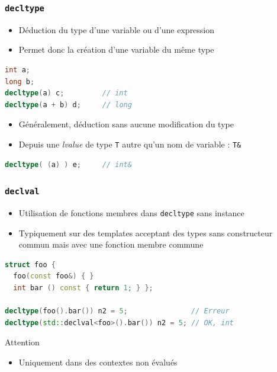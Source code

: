 \documentclass[C++.tex]{subfiles}
\begin{document}
\begin{frame}[fragile]
	\frametitle{\lstinline|decltype|}
	\begin{itemize}
		\item Déduction du type d'une variable ou d'une expression
		\item Permet donc la création d'une variable du même type
	\end{itemize}

	\begin{lstlisting}[language=C++]
int a;
long b;
decltype(a) c;         // int
decltype(a + b) d;     // long\end{lstlisting}

	\begin{itemize}
		\item Généralement, déduction sans aucune modification du type


		\item Depuis une \textit{lvalue} de type \lstinline|T| autre qu'un nom de variable : \lstinline|T&|
	\end{itemize}

	\begin{lstlisting}[language=C++]
decltype( (a) ) e;     // int&\end{lstlisting}

\end{frame}

\begin{frame}[fragile]
	\frametitle{\lstinline|declval|}
	\begin{itemize}
		\item Utilisation de fonctions membres dans \lstinline|decltype| sans instance
		\item Typiquement sur des templates acceptant des types sans constructeur commun mais avec une fonction membre commune
	\end{itemize}
	
	\begin{lstlisting}[language=C++]
struct foo {
  foo(const foo&) { }
  int bar () const { return 1; } };

decltype(foo().bar()) n2 = 5;               // Erreur
decltype(std::declval<foo>().bar()) n2 = 5; // OK, int\end{lstlisting}

	\begin{alertblock}{Attention}
		\begin{itemize}
			\item Uniquement dans des contextes non évalués
		\end{itemize}
	\end{alertblock}
\end{frame}
\end{document}
